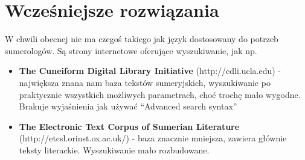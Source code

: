 \chapter{Wcześniejsze rozwiązania}\label{r:losers}
W chwili obecnej nie ma czegoś takiego jak język dostosowany do potrzeb sumerologów. Są strony internetowe oferujące wyszukiwanie, 
jak np.
\begin{itemize}
\item \textbf{The Cuneiform Digital Library Initiative} (http://cdli.ucla.edu) - największa znana nam baza tekstów sumeryjskich, 
wyszukiwanie po praktycznie wszystkich możliwych parametrach, choć trochę mało wygodne. Brakuje wyjaśnienia jak 
używać ``Advanced search syntax''
\item \textbf{The Electronic Text Corpus of Sumerian Literature} (http://etcsl.orinst.ox.ac.uk/) - baza znacznie mniejsza, zawiera 
głównie teksty literackie. Wyszukiwanie mało rozbudowane.
\end{itemize}
